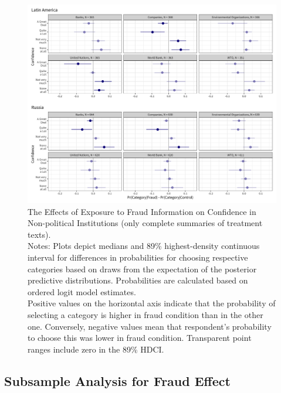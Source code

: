 \documentclass[11pt, ngerman,english,a4]{article}
\begin{document}
\begin{figure}[H]
	\centering
	\includegraphics[width=\linewidth,trim=4 4 4 4,clip]{figs/main_hdi89_7.png}
	\caption{The Effects of Exposure to Fraud Information on Confidence in Non-political Institutions (only complete summaries of treatment texts).  \\
		\footnotesize{Notes: Plots depict medians and 89\% highest-density continuous interval for differences in probabilities for choosing respective categories based on draws from the expectation of the posterior predictive distributions. Probabilities are calculated based on ordered logit model estimates.\\
			Positive values on the horizontal axis indicate that the probability of selecting a category is higher in fraud condition than in the other one. Conversely, negative values mean that respondent's probability to choose this was lower in fraud condition. 
Transparent point ranges include zero in the 89\% HDCI.\\
	} }
	\singlespacing
	\raggedright
	    
	\label{fig:main-7}
\end{figure}

% 
% 

\clearpage
\subsection*{Subsample Analysis for Fraud Effect}
\end{document}
